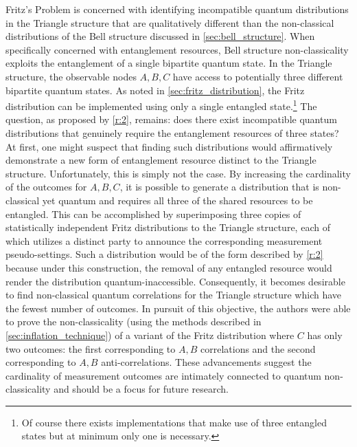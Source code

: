 \documentclass[aps, 10pt, english, twoside, pra, nofootinbib, tightenlines, longbibliography, superscriptaddress]{revtex4-1}
\begin{document}
    Fritz's Problem is concerned with identifying incompatible quantum distributions in the Triangle structure that are qualitatively different than the non-classical distributions of the Bell structure discussed in \cref{sec:bell_structure}. When specifically concerned with entanglement resources, Bell structure non-classicality exploits the entanglement of a single bipartite quantum state. In the Triangle structure, the observable nodes $A,B,C$ have access to potentially three different bipartite quantum states. As noted in \cref{sec:fritz_distribution}, the Fritz distribution can be implemented using only a single entangled state.\footnote{Of course there exists implementations that make use of three entangled states but at minimum only one is necessary.} The question, as proposed by \ref{r:2}, remains: does there exist incompatible quantum distributions that genuinely require the entanglement resources of three states? At first, one might suspect that finding such distributions would affirmatively demonstrate a new form of entanglement resource distinct to the Triangle structure. Unfortunately, this is simply not the case. By increasing the cardinality of the outcomes for $A, B, C$, it is possible to generate a distribution that is non-classical yet quantum and requires all three of the shared resources to be entangled. This can be accomplished by superimposing three copies of statistically independent Fritz distributions to the Triangle structure, each of which utilizes a distinct party to announce the corresponding measurement pseudo-settings. Such a distribution would be of the form described by \ref{r:2} because under this construction, the removal of any entangled resource would render the distribution quantum-inaccessible. Consequently, it becomes desirable to find non-classical quantum correlations for the Triangle structure which have the fewest number of outcomes. In pursuit of this objective, the authors were able to prove the non-classicality (using the methods described in \cref{sec:inflation_technique}) of a variant of the Fritz distribution where $C$ has only two outcomes: the first corresponding to $A, B$ correlations and the second corresponding to $A, B$ anti-correlations. These advancements suggest the cardinality of measurement outcomes are intimately connected to quantum non-classicality and should be a focus for future research.
\end{document}
